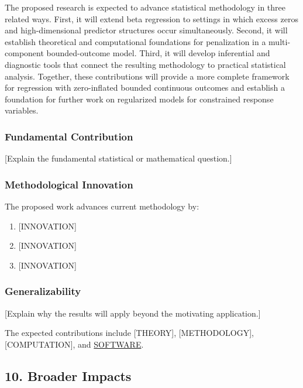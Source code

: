 \documentclass[
  11pt,
  letterpaper,
]{article}
\providecommand{\tightlist}{%
  \setlength{\itemsep}{0pt}\setlength{\parskip}{0pt}}\usepackage{longtable,booktabs,array}
\begin{document}
The proposed research is expected to advance statistical methodology in
three related ways. First, it will extend beta regression to settings in
which excess zeros and high-dimensional predictor structures occur
simultaneously. Second, it will establish theoretical and computational
foundations for penalization in a multi-component bounded-outcome model.
Third, it will develop inferential and diagnostic tools that connect the
resulting methodology to practical statistical analysis. Together, these
contributions will provide a more complete framework for regression with
zero-inflated bounded continuous outcomes and establish a foundation for
further work on regularized models for constrained response variables.

\subsubsection{Fundamental Contribution}\label{fundamental-contribution}

{[}Explain the fundamental statistical or mathematical question.{]}

\subsubsection{Methodological
Innovation}\label{methodological-innovation}

The proposed work advances current methodology by:

\begin{enumerate}
\def\labelenumi{\arabic{enumi}.}
\tightlist
\item
  {[}INNOVATION{]}
\item
  {[}INNOVATION{]}
\item
  {[}INNOVATION{]}
\end{enumerate}

\subsubsection{Generalizability}\label{generalizability}

{[}Explain why the results will apply beyond the motivating
application.{]}

The expected contributions include {[}THEORY{]}, {[}METHODOLOGY{]},
{[}COMPUTATION{]}, and \hyperref[software]{SOFTWARE}.

\subsection{10. Broader Impacts}\label{broader-impacts-1}
\end{document}
